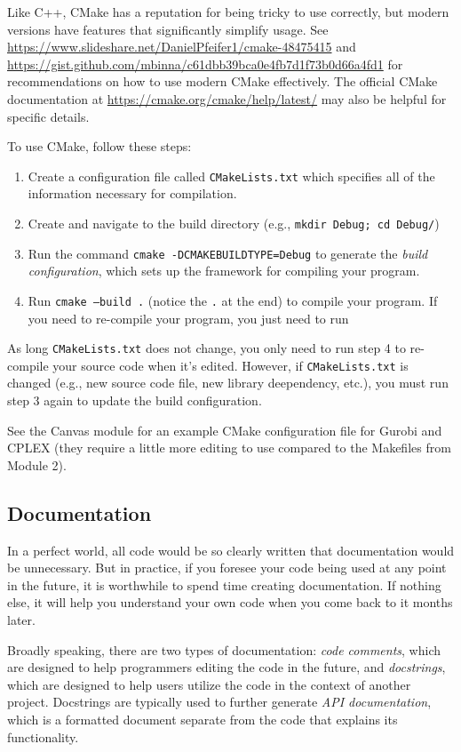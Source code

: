 \documentclass[12pt]{article}
\begin{document}
Like C++, CMake has a reputation for being tricky to use correctly, but modern versions have features that significantly simplify usage. See \url{https://www.slideshare.net/DanielPfeifer1/cmake-48475415} and \url{https://gist.github.com/mbinna/c61dbb39bca0e4fb7d1f73b0d66a4fd1} for recommendations on how to use modern CMake effectively. The official CMake documentation at \url{https://cmake.org/cmake/help/latest/} may also be helpful for specific details.

To use CMake, follow these steps:
\begin{enumerate}
    \item Create a configuration file called \texttt{CMakeLists.txt} which specifies all of the information necessary for compilation.
    \item Create and navigate to the build directory (e.g., \texttt{mkdir Debug; cd Debug/})
    \item Run the command \texttt{cmake -DCMAKE\ttul BUILD\ttul TYPE=Debug} to generate the \emph{build configuration}, which sets up the framework for compiling your program.
    \item Run \texttt{cmake --build .} (notice the \texttt{.} at the end) to compile your program. If you need to re-compile your program, you just need to run 
\end{enumerate}
As long \texttt{CMakeLists.txt} does not change, you only need to run step 4 to re-compile your source code when it's edited. However, if \texttt{CMakeLists.txt} is changed (e.g., new source code file, new library deependency, etc.), you must run step 3 again to update the build configuration.

See the Canvas module for an example CMake configuration file for Gurobi and CPLEX (they require a little more editing to use compared to the Makefiles from Module 2).


\subsection{Documentation}
In a perfect world, all code would be so clearly written that documentation would be unnecessary. But in practice, if you foresee your code being used at any point in the future, it is worthwhile to spend time creating documentation. If nothing else, it will help you understand your own code when you come back to it months later.

Broadly speaking, there are two types of documentation: \emph{code comments}, which are designed to help programmers editing the code in the future, and \emph{docstrings}, which are designed to help users utilize the code in the context of another project. Docstrings are typically used to further generate \emph{API documentation}, which is a formatted document separate from the code that explains its functionality.
\end{document}
